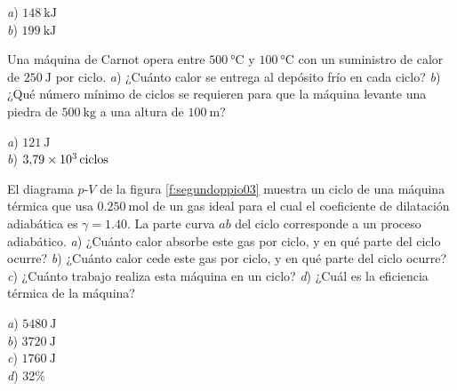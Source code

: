 \begin{Answer}
	\begin{minipage}[t]{.4\textwidth}
    \textit{a}) $\SI{148}{\kilo\joule}$\\ \textit{b}) $\SI{199}{\kilo\joule}$
  \end{minipage}
\end{Answer}
%
\begin{Exercise}
  {}{}
  Una máquina de Carnot opera entre $\SI{500}{\celsius}$ y $\SI{100}{\celsius}$ con un suministro de calor de $\SI{250}{\joule}$ por ciclo. \textit{a}) ¿Cuánto calor se entrega al depósito frío en cada ciclo? \textit{b}) ¿Qué número mínimo de ciclos se requieren para que la máquina levante una piedra de $\SI{500}{\kilogram}$ a una altura de $\SI{100}{\metre}$?
\end{Exercise}
\begin{Answer}
	\begin{minipage}[t]{.4\textwidth}
    \textit{a}) $\SI{121}{\joule}$\\ \textit{b}) $\SI{3.79E3}{ciclos}$
  \end{minipage}
\end{Answer}
%
\begin{Exercise}\label{p:segundoppio03}
  {}{}
  El diagrama $p$-$V$ de la figura \ref{f:segundoppio03} muestra un ciclo de una máquina térmica que usa $\SI{0.250}{\mole}$ de un gas ideal para el cual el coeficiente de dilatación adiabática es $\gamma = 1.40$. La parte curva $ab$ del ciclo corresponde a un proceso adiabático. \textit{a}) ¿Cuánto calor absorbe este gas por ciclo, y en qué parte del ciclo ocurre? \textit{b}) ¿Cuánto calor cede este gas por ciclo, y en qué parte del ciclo ocurre? \textit{c}) ¿Cuánto trabajo realiza esta máquina en un ciclo? \textit{d}) ¿Cuál es la eficiencia térmica de la máquina?
\end{Exercise}
\begin{Answer}
	\begin{minipage}[t]{.4\textwidth}
    \textit{a}) $\SI{5480}{\joule}$\\ \textit{b}) $\SI{3720}{\joule}$\\ \textit{c}) $\SI{1760}{\joule}$\\ \textit{d}) 32\%
  \end{minipage}
\end{Answer}
%
